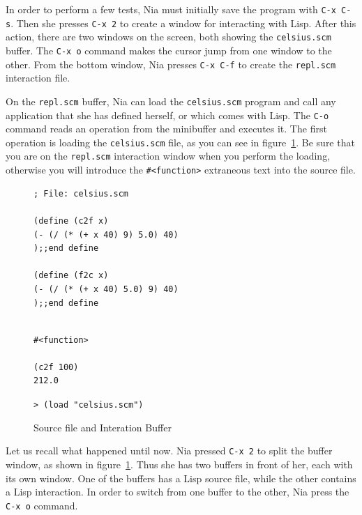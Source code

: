 \documentclass[a4paper,12pt]{book}
\newenvironment{fmpage}[1]
           {\begin{lrbox}{\fmbox}\begin{minipage}{#1}}
           {\end{minipage}\end{lrbox}\fbox{\usebox{\fmbox}}}
\begin{document}
In order to perform a few tests, Nia must initially save
the program with \verb|C-x C-s|. Then she 
presses \verb|C-x 2| to create a window for interacting
with Lisp. After this action, there are two
windows on the screen, both 
showing the \verb|celsius.scm| buffer. The \verb|C-x o| command
makes the cursor jump from one window to the other.
From the bottom window, Nia presses \verb|C-x C-f| to
create the \verb|repl.scm| interaction file. 

On the \verb|repl.scm| buffer, 
Nia can load the \verb|celsius.scm| program
and  call any application that she has defined
herself, or which comes with Lisp.
The \verb|C-o| command reads an operation
from the  minibuffer and executes it.
The first operation is loading
the \verb|celsius.scm| file,
as you can see in figure~\ref{fig:repl}.
Be sure that you
are on the \verb|repl.scm| 
interaction window when you perform
the loading, otherwise you will introduce
the \verb|#<function>| extraneous 
text into the source file.

\begin{figure}[!b]
\begin{fmpage}{0.8\linewidth}
\begin{verbatim}
; File: celsius.scm

(define (c2f x)
(- (/ (* (+ x 40) 9) 5.0) 40)
);;end define

(define (f2c x)
(- (/ (* (+ x 40) 5.0) 9) 40)
);;end define
\end{verbatim}
\end{fmpage}

\begin{fmpage}{0.8\linewidth}
\begin{verbatim}

#<function>

(c2f 100)
212.0

\end{verbatim}
\end{fmpage}

\begin{fmpage}{0.8\linewidth}
\verb|> (load "celsius.scm")|
\end{fmpage}
\caption{Source file and Interation Buffer}
\label{fig:repl}
\end{figure}

Let us recall what happened until now.
Nia pressed \verb|C-x 2| to split 
the buffer window, as shown in figure~\ref{fig:repl}.
Thus she has two buffers in front of her,
each with its own window. One of the buffers has
a Lisp source file, while the other contains a Lisp 
interaction. In order to  switch
from one buffer to the other,
Nia press the \verb|C-x o| command.
\end{document}
